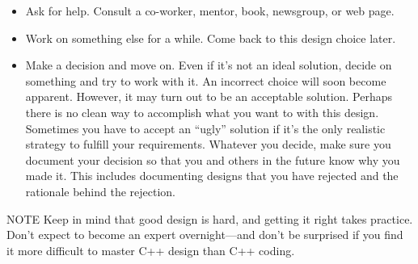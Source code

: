 \begin{itemize}
\item
Ask for help. Consult a co-worker, mentor, book, newsgroup, or web page.

\item
Work on something else for a while. Come back to this design choice later.

\item
Make a decision and move on. Even if it’s not an ideal solution, decide on something and try to work with it. An incorrect choice will soon become apparent. However, it may turn out to be an acceptable solution. Perhaps there is no clean way to accomplish what you want to with this design. Sometimes you have to accept an “ugly” solution if it’s the only realistic strategy to fulfill your requirements. Whatever you decide, make sure you document your decision so that you and others in the future know why you made it. This includes documenting designs that you have rejected and the rationale behind the rejection.
\end{itemize}

\begin{myNotic}{NOTE}
Keep in mind that good design is hard, and getting it right takes practice. Don’t expect to become an expert overnight—and don’t be surprised if you find it more difficult to master C++ design than C++ coding.
\end{myNotic}











